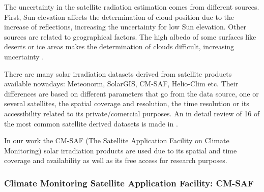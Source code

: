 The uncertainty in the satellite radiation estimation comes from different sources. First, Sun elevation affects the determination of cloud position due to the increase of reflections, increasing  the uncertainty for low Sun elevation. Other sources are related to geographical factors. The high albedo of some surfaces like deserts or ice areas makes the determination of clouds difficult, increasing uncertainty \cite*{Cebecauer2011}.

There are many solar irradiation datasets derived from satellite products available nowadays: Meteonorm, SolarGIS, CM-SAF, Helio-Clim etc. Their differences are based on different parameters that go from the data source, one or several satellites, the spatial coverage and resolution, the time resolution or its accessibility related to its private/comercial purposes. An in detail review of 16 of the most common satellite derived datasets is made in \cite*{Vernay2014}.

 

In our work the CM-SAF (The Satellite Application Facility on Climate Monitoring) solar irradiation products are used due to its spatial and time coverage and availability as well as its free access for research purposes.

\subsubsection{Climate Monitoring Satellite Application Facility: CM-SAF}
 

